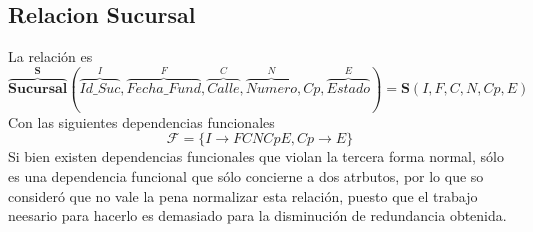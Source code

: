 \documentclass[10pt]{article}
\begin{document}
   \subsection{Relacion Sucursal}
   La relación es 
   \[\overbrace{{\textbf{Sucursal}}}^{\textbf{S}} 
   (
	   \overbrace{Id\_Suc}^{I}, \overbrace{Fecha\_Fund}^{F},
	   \overbrace{Calle}^{C}, \overbrace{Numero}^{N}, Cp,
	   \overbrace{Estado}^{E}
	)
	= 
	\textbf{S}(I, F, C, N, Cp, E)
	\]
   Con las siguientes dependencias funcionales
   \[\mathcal{F} = \{I \rightarrow FCNCpE, Cp \rightarrow E\}\]
   Si bien existen dependencias funcionales que violan la tercera forma normal,
   sólo es una dependencia funcional que sólo concierne a dos atrbutos, por lo
   que so consideró que no vale la pena normalizar esta relación, puesto que el
   trabajo neesario para hacerlo es demasiado para la disminución de redundancia
   obtenida.
	
\end{document}
